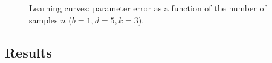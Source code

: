 \begin{table}[tbhp]
\begin{center}
\begin{small}
\begin{sc}
\begin{tabular}{ r r r c c c }
\hline

\end{tabular}
\end{sc}
\end{small}
\end{center}
\vskip -0.1in
\end{table}


\begin{figure}[tbhp]
  \centering
    \hspace{-2em}
  \caption{Learning curves: parameter error as a function of the number of samples $n$ ($b = 1, d = 5, k = 3$).}
  \label{fig:vs-n}
\end{figure}


\subsection{Results}

